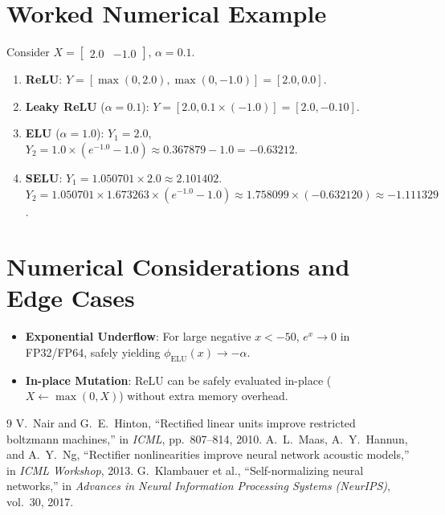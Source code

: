 \documentclass[11pt,a4paper]{article}
\theoremstyle{definition}
\begin{document}
\section{Worked Numerical Example}

Consider $X = \begin{bmatrix} 2.0 & -1.0 \end{bmatrix}$, $\alpha = 0.1$.

\begin{enumerate}
    \item \textbf{ReLU}: $Y = [\max(0, 2.0), \max(0, -1.0)] = [2.0, 0.0]$.
    \item \textbf{Leaky ReLU} ($\alpha = 0.1$): $Y = [2.0, 0.1 \times (-1.0)] = [2.0, -0.10]$.
    \item \textbf{ELU} ($\alpha = 1.0$):
    $Y_1 = 2.0$, $Y_2 = 1.0 \times (e^{-1.0} - 1.0) \approx 0.367879 - 1.0 = -0.63212$.
    \item \textbf{SELU}:
    $Y_1 = 1.050701 \times 2.0 \approx 2.101402$.
    $Y_2 = 1.050701 \times 1.673263 \times (e^{-1.0} - 1.0) \approx 1.758099 \times (-0.632120) \approx -1.111329$.
\end{enumerate}

\section{Numerical Considerations and Edge Cases}

\begin{itemize}
    \item \textbf{Exponential Underflow}: For large negative $x < -50$, $e^x \to 0$ in FP32/FP64, safely yielding $\phi_{\text{ELU}}(x) \to -\alpha$.
    \item \textbf{In-place Mutation}: ReLU can be safely evaluated in-place ($X \leftarrow \max(0, X)$) without extra memory overhead.
\end{itemize}

\begin{thebibliography}{9}
 V.~Nair and G.~E.~Hinton, ``Rectified linear units improve restricted boltzmann machines,'' in \emph{ICML}, pp.~807--814, 2010.
 A.~L.~Maas, A.~Y.~Hannun, and A.~Y.~Ng, ``Rectifier nonlinearities improve neural network acoustic models,'' in \emph{ICML Workshop}, 2013.
 G.~Klambauer et al., ``Self-normalizing neural networks,'' in \emph{Advances in Neural Information Processing Systems (NeurIPS)}, vol.~30, 2017.
\end{thebibliography}
\end{document}
